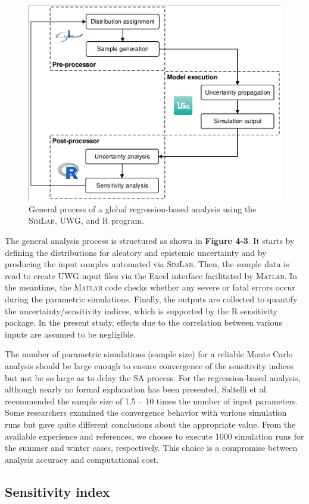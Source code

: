 \begin{figure}[!b]
\centering
\includegraphics[width=.55\linewidth,trim=2 2 2 2,clip]{Framework.pdf}
\caption{General process of a global regression-based analysis using the \textsc{SimLab}, UWG, and \textsc{R} program.}
\end{figure}

The general analysis process is structured as shown in \textbf{Figure 4-3}. It starts by defining the distributions for aleatory and epistemic uncertainty and by producing the input samples automated via \textsc{SimLab}. Then, the sample data is read to create UWG input files via the Excel interface facilitated by \textsc{Matlab}. In the meantime, the \textsc{Matlab} code checks whether any severe or fatal errors occur during the parametric simulations. Finally, the outputs are collected to quantify the uncertainty/sensitivity indices, which is supported by the \textsc{R} sensitivity package. In the present study, effects due to the correlation between various inputs are assumed to be negligible.

The number of parametric simulations (sample size) for a reliable Monte Carlo analysis should be large enough to ensure convergence of the sensitivity indices but not be so large as to delay the SA process. For the regression-based analysis, although nearly no formal explanation has been presented, Saltelli et al. \cite{saltelli2004sensitivity} recommended the sample size of 1.5 -- 10 times the number of input parameters. Some researchers \cite{nguyen2015performance,menberg2016sensitivity} examined the convergence behavior with various simulation runs but gave quite different conclusions about the appropriate value. From the available experience and references, we choose to execute 1000 simulation runs for the summer and winter cases, respectively. This choice is a compromise between analysis accuracy and computational cost.

\subsection{Sensitivity index}

